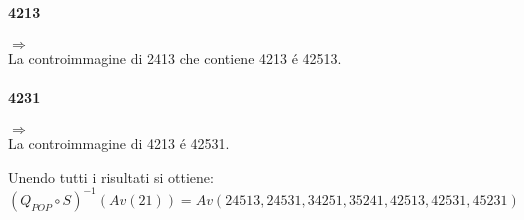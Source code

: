 \paragraph*{4213}\begin{center}$\Rightarrow$\\La controimmagine di 2413 che contiene 4213 \'e 42513.\end{center}
\paragraph*{4231}\begin{center}$\Rightarrow$\\La controimmagine di 4213 \'e 42531.\end{center}
Unendo tutti i risultati si ottiene:$$(Q_{POP}\circ{S})^{-1}(Av(21)) = Av(24513, 24531, 34251, 35241, 42513, 42531, 45231)$$
